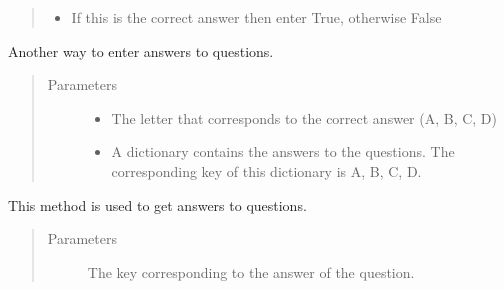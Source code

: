 \documentclass[letterpaper,10pt,english]{sphinxmanual}
\begin{document}
\begin{fulllineitems}
\begin{fulllineitems}
\begin{quote}
\begin{description}
\begin{itemize}
\item {} 
 \textendash{} If this is the correct answer then enter True, otherwise False

\end{itemize}

\end{description}\end{quote}

\end{fulllineitems}


\begin{fulllineitems}
\label{\detokenize{index:pytexexam.question.Question.answers}}
Another way to enter answers to questions.
\begin{quote}\begin{description}
\item[{Parameters}] \leavevmode\begin{itemize}
\item {} 
 \textendash{} The letter that corresponds to the correct answer (A, B, C, D)

\item {} 
 \textendash{} A dictionary contains the answers to the questions.         The corresponding key of this dictionary is A, B, C, D.

\end{itemize}

\end{description}\end{quote}

\end{fulllineitems}


\begin{fulllineitems}
\label{\detokenize{index:pytexexam.question.Question.get_answer}}
This method is used to get answers to questions.
\begin{quote}\begin{description}
\item[{Parameters}] \leavevmode
{} \textendash{} The key corresponding to the answer of the question.


\end{description}
\end{quote}
\end{fulllineitems}
\end{fulllineitems}
\end{document}
